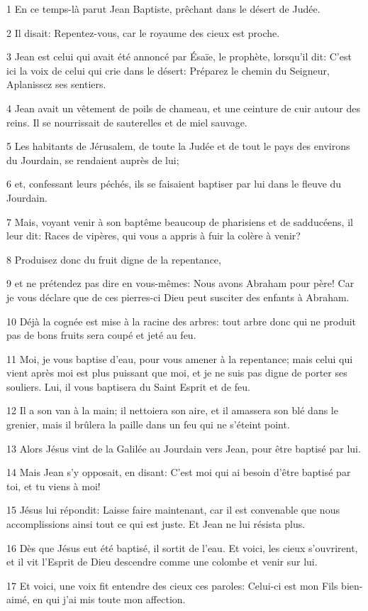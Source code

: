 \par 1 En ce temps-là parut Jean Baptiste, prêchant dans le désert de Judée.
\par 2 Il disait: Repentez-vous, car le royaume des cieux est proche.
\par 3 Jean est celui qui avait été annoncé par Ésaïe, le prophète, lorsqu'il dit: C'est ici la voix de celui qui crie dans le désert: Préparez le chemin du Seigneur, Aplanissez ses sentiers.
\par 4 Jean avait un vêtement de poils de chameau, et une ceinture de cuir autour des reins. Il se nourrissait de sauterelles et de miel sauvage.
\par 5 Les habitants de Jérusalem, de toute la Judée et de tout le pays des environs du Jourdain, se rendaient auprès de lui;
\par 6 et, confessant leurs péchés, ils se faisaient baptiser par lui dans le fleuve du Jourdain.
\par 7 Mais, voyant venir à son baptême beaucoup de pharisiens et de sadducéens, il leur dit: Races de vipères, qui vous a appris à fuir la colère à venir?
\par 8 Produisez donc du fruit digne de la repentance,
\par 9 et ne prétendez pas dire en vous-mêmes: Nous avons Abraham pour père! Car je vous déclare que de ces pierres-ci Dieu peut susciter des enfants à Abraham.
\par 10 Déjà la cognée est mise à la racine des arbres: tout arbre donc qui ne produit pas de bons fruits sera coupé et jeté au feu.
\par 11 Moi, je vous baptise d'eau, pour vous amener à la repentance; mais celui qui vient après moi est plus puissant que moi, et je ne suis pas digne de porter ses souliers. Lui, il vous baptisera du Saint Esprit et de feu.
\par 12 Il a son van à la main; il nettoiera son aire, et il amassera son blé dans le grenier, mais il brûlera la paille dans un feu qui ne s'éteint point.
\par 13 Alors Jésus vint de la Galilée au Jourdain vers Jean, pour être baptisé par lui.
\par 14 Mais Jean s'y opposait, en disant: C'est moi qui ai besoin d'être baptisé par toi, et tu viens à moi!
\par 15 Jésus lui répondit: Laisse faire maintenant, car il est convenable que nous accomplissions ainsi tout ce qui est juste. Et Jean ne lui résista plus.
\par 16 Dès que Jésus eut été baptisé, il sortit de l'eau. Et voici, les cieux s'ouvrirent, et il vit l'Esprit de Dieu descendre comme une colombe et venir sur lui.
\par 17 Et voici, une voix fit entendre des cieux ces paroles: Celui-ci est mon Fils bien-aimé, en qui j'ai mis toute mon affection.

